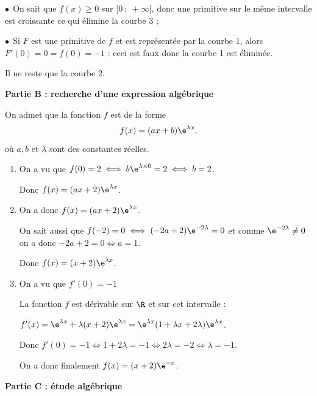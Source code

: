 \begin{enumerate}
$\bullet~~$On sait que $f(x) \geqslant 0$ sur $[0~;~+ \infty[$, donc une primitive sur le même intervalle est croissante ce qui élimine la courbe 3 ;

$\bullet~~$Si $F$ est une primitive de $f$ et est représentée par la courbe 1, alors $F'(0) = 0 = f(0) = - 1$ : ceci est faux donc la courbe 1 est éliminée.

Il ne reste que la courbe 2.
\end{enumerate}

\medskip

\begin{center}\textbf{Partie B :  recherche d'une expression algébrique}\end{center}

On admet que la fonction $f$ est de la forme 
\[f(x)= (ax + b)\e^{\lambda x},\]
où $a, b$ et $\lambda$ sont des constantes réelles.


\medskip

\begin{enumerate}
\item %
On a vu que $f(0) = 2 \iff b\e^{\lambda \times 0} = 2 \iff b = 2$.

Donc $f(x) = (ax + 2)\e^{\lambda x}$.
\item %

On a donc $f(x) = (ax + 2)\e^{\lambda x}$.

On sait aussi que $f(-2) = 0 \iff (-2a + 2)\e^{-2\lambda } = 0$ et comme $\e^{-2\lambda }  \ne 0$ on a donc $-2a + 2 = 0 \iff a = 1$.

Donc $f(x) = (x + 2)\e^{\lambda x}$.
\item %
On a vu que $f'(0) = - 1$

La fonction $f$ est dérivable sur $\R$ et sur cet intervalle :

$f'(x) = \e^{\lambda x} + \lambda (x + 2)\e^{\lambda x} = \e^{\lambda x}(1 + \lambda x + 2\lambda )\e^{\lambda x}$.

Donc $f'(0) = - 1 \iff 1  + 2\lambda = - 1 \iff 2\lambda  = - 2 \iff \lambda = - 1 $.

On a donc finalement $f(x) = (x + 2)\e^{- x}$.
\end{enumerate}

\medskip

\begin{center}\textbf{Partie C : étude algébrique}\end{center}

